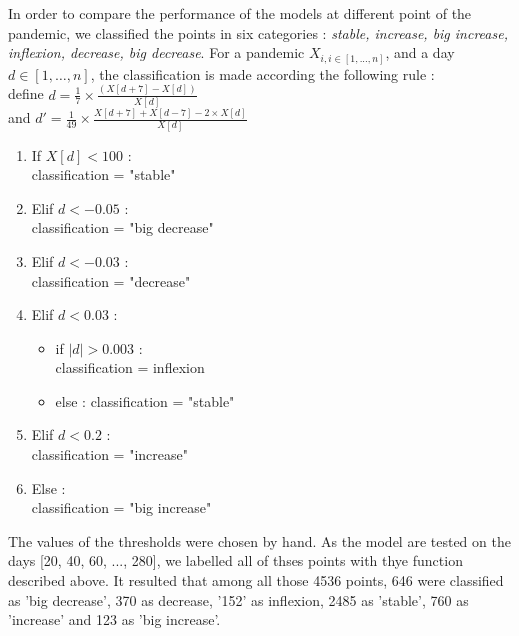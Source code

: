 In order to compare the performance of the models at different point of the pandemic, we classified the points in six categories : \textit{stable, increase, big increase, inflexion, decrease, big decrease}.
For a pandemic $X_{i, i \in [1, ..., n]}$, and a day $d \in [1, \hdots, n]$, the classification is made according the following rule : \\
define $d = \frac{1}{7} \times \frac{ (X[d+7] - X[d])} {X[d]}$\\
and $d' = \frac{1}{49} \times \frac{X[d+7] + X[d-7] - 2 \times X[d]}{X[d]}$
\begin{enumerate}
    \item If $X[d] < 100$ : \\
    classification = "stable"
    \item Elif $d < - 0.05$ : \\
    classification = "big decrease"
    \item Elif $d < -0.03$ : \\
    classification = "decrease"
    \item Elif $d < 0.03$ : \\
    \begin{itemize}
        \item if $\vert d  \vert > 0.003$ : \\
        classification = inflexion
        \item else :
        classification = "stable" 
    \end{itemize}
    \item Elif $d < 0.2$ : \\
    classification = "increase"
    \item Else : \\
     classification = "big increase"
\end{enumerate}


The values of the thresholds were chosen by hand. 
As the model are tested on the days [20, 40, 60, ..., 280], we labelled all of thses points with thye function described above. 
It resulted that among all those 4536 points, 646 were classified as 'big decrease', 370 as decrease, '152' as inflexion, 2485 as 'stable', 760 as 'increase' and 123 as 'big increase'.
